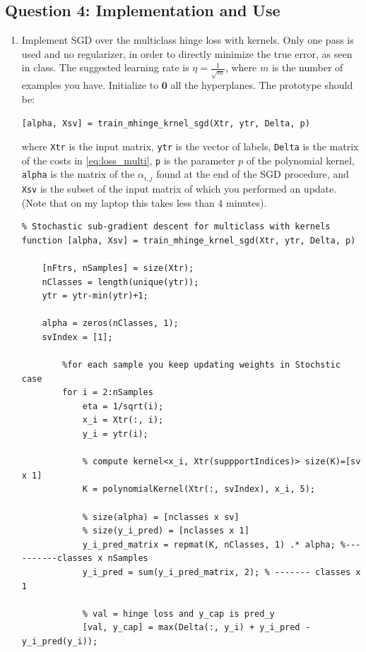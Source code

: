 \documentclass{article}
\begin{document}
\subsection{Question 4: Implementation and Use}
\begin{enumerate}[label=(\alph*)]
\item Implement SGD over the multiclass hinge loss with kernels. Only one pass is used and no regularizer, in order to directly minimize the true error, as seen in class. The suggested learning rate is $\eta=\frac{1}{\sqrt{m}}$, where $m$ is the number of examples you have. Initialize to $\boldsymbol{0}$ all the hyperplanes.
The prototype should be:
\begin{verbatim}
[alpha, Xsv] = train_mhinge_krnel_sgd(Xtr, ytr, Delta, p)
\end{verbatim}
where \texttt{Xtr} is the input matrix, \texttt{ytr} is the vector of labels, \texttt{Delta} is the matrix of the costs in \eqref{eq:loss_multi}, \texttt{p} is the parameter $p$ of the polynomial kernel, \texttt{alpha} is the matrix of the $\alpha_{i,j}$ found at the end of the SGD procedure, and \texttt{Xsv} is the subset of the input matrix of which you performed an update.
(Note that on my laptop this takes less than 4 minutes).
\begin{verbatim}
% Stochastic sub-gradient descent for multiclass with kernels
function [alpha, Xsv] = train_mhinge_krnel_sgd(Xtr, ytr, Delta, p)
           
    [nFtrs, nSamples] = size(Xtr);
    nClasses = length(unique(ytr));
    ytr = ytr-min(ytr)+1;    

    alpha = zeros(nClasses, 1);
    svIndex = [1];
           
        %for each sample you keep updating weights in Stochstic case
        for i = 2:nSamples
            eta = 1/sqrt(i);
            x_i = Xtr(:, i);         
            y_i = ytr(i);
            
            % compute kernel<x_i, Xtr(suppportIndices)> size(K)=[sv x 1]
            K = polynomialKernel(Xtr(:, svIndex), x_i, 5);
            
            % size(alpha) = [nclasses x sv]
            % size(y_i_pred) = [nclasses x 1]
            y_i_pred_matrix = repmat(K, nClasses, 1) .* alpha; %----------classes x nSamples
            y_i_pred = sum(y_i_pred_matrix, 2); % ------- classes x 1
            
            % val = hinge loss and y_cap is pred_y
            [val, y_cap] = max(Delta(:, y_i) + y_i_pred - y_i_pred(y_i));
            

\end{verbatim}
\end{enumerate}
\end{document}
